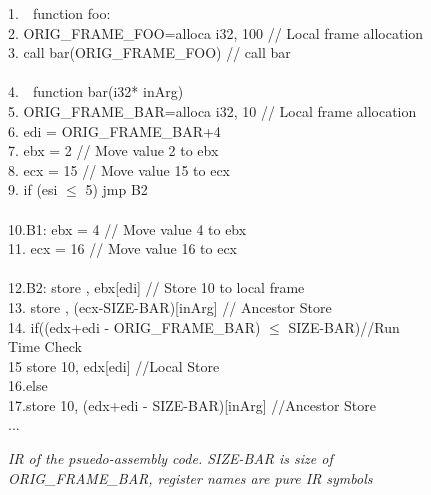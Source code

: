 \begin{figure*}[t]
{{\begin{minipage}[t]{.5\linewidth}
{\begin{scriptsize}
\begin{tabbing}
1.\ \ function foo:\\
2.\> \>ORIG\_FRAME\_FOO=alloca i32, 100 \>\>// Local frame allocation \\
3.\> \>call\> bar(ORIG\_FRAME\_FOO)   \>// call bar \\
\\
4.\ \ function bar(i32* inArg) \\
5.\> \>ORIG\_FRAME\_BAR=alloca i32, 10  \> \>// Local frame allocation \\
6.\> \> edi = ORIG\_FRAME\_BAR+4 \> \> \\
7.\>\> ebx = 2    \>\>// Move value 2 to ebx\\
8.\>\> ecx = 15    \>\>// Move value 15 to ecx\\
9.\>\> if (esi $\leq$ 5) jmp B2\\
\\
10.\>B1:\> ebx = 4    \>\>// Move value 4 to ebx\\
11.\>\> ecx = 16    \>\>// Move value 16 to ecx\\
\\
12.\>B2:\> store , ebx[edi]  \>// Store 10 to local frame\\
13.\>\> store , (ecx-SIZE-BAR)[inArg]  \>// Ancestor Store\\
14.\>\> if((edx+edi - ORIG\_FRAME\_BAR) $\leq$ SIZE-BAR)\>\>\>\>//Run Time Check\\
15 \>\> \>store 10, edx[edi]\>\> //Local Store\\
16.\>\>else\\
17.\>\>\>store 10, (edx+edi - SIZE-BAR)[inArg] \>\>//Ancestor Store\\
...
\end{tabbing}
\end{scriptsize}
\vspace{-.2in}
\caption {\textit{IR of the psuedo-assembly code. SIZE-BAR is size of ORIG\_FRAME\_BAR, register names are pure IR symbols}}
\label{fig:argirex}
}
\end{minipage} 

}
\vspace{-3ex}
}
\end{figure*}

